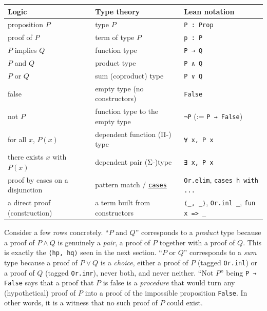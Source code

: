 \begin{longtable}[]{@{}
  >{\raggedright\arraybackslash}p{}
  >{\raggedright\arraybackslash}p{}
  >{\raggedright\arraybackslash}p{}@{}}
\toprule\noalign{}
\begin{minipage}[b]{\linewidth}\raggedright
Logic
\end{minipage} & \begin{minipage}[b]{\linewidth}\raggedright
Type theory
\end{minipage} & \begin{minipage}[b]{\linewidth}\raggedright
Lean notation
\end{minipage} \\
\midrule\noalign{}
\endhead
\bottomrule\noalign{}
\endlastfoot
proposition \(P\) & type \(P\) & \texttt{P : Prop} \\
proof of \(P\) & term of type \(P\) & \texttt{p : P} \\
\(P\) implies \(Q\) & function type & \texttt{P → Q} \\
\(P\) and \(Q\) & product type & \texttt{P ∧ Q} \\
\(P\) or \(Q\) & sum (coproduct) type & \texttt{P ∨ Q} \\
false & empty type (no constructors) & \texttt{False} \\
not \(P\) & function type to the empty type & \texttt{¬P} (:= \texttt{P → False}) \\
for all \(x\), \(P(x)\) & dependent function (Π-) type & \texttt{∀ x, P x} \\
there exists \(x\) with \(P(x)\) & dependent pair (Σ-)type & \texttt{∃ x, P x} \\
proof by cases on a disjunction & pattern match / \href{https://lean-lang.org/doc/reference/latest/Tactic-Proofs/Tactic-Reference/}{\texttt{cases}} & \texttt{Or.elim}, \texttt{cases h with ...} \\
a direct proof (construction) & a term built from constructors & \texttt{⟨\_\allowbreak{}, \_\allowbreak{}⟩}, \texttt{Or.inl \_\allowbreak{}}, \texttt{fun x => \_\allowbreak{}} \\
\end{longtable}

Consider a few rows concretely. ``\(P\) and \(Q\)'' corresponds to a \emph{product} type because a proof of \(P \wedge Q\) is genuinely a \emph{pair}, a proof of \(P\) together with a proof of \(Q\). This is exactly the \texttt{⟨hp, hq⟩} seen in the next section. ``\(P\) or \(Q\)'' corresponds to a \emph{sum} type because a proof of \(P \vee Q\) is a \emph{choice}, either a proof of \(P\) (tagged \texttt{Or.inl}) or a proof of \(Q\) (tagged \texttt{Or.inr}), never both, and never neither. ``Not \(P\)'' being \texttt{P → False} says that a proof that \(P\) is false is a \emph{procedure} that would turn any (hypothetical) proof of \(P\) into a proof of the impossible proposition \texttt{False}. In other words, it is a witness that no such proof of \(P\) could exist.

